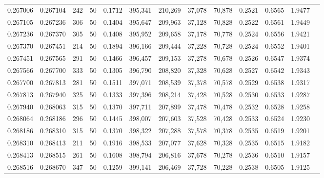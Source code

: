 \begin{tabular}{rrrrrrrrrrrrr}
0.267006 & 0.267104 &   242 &  50 &                                     0.1712 & 395,341 & 210,269 &  37,078 &  70,878 & 0.2521 & 0.6565 & 1.9477 \\
0.267105 & 0.267236 &   306 &  50 &                                     0.1404 & 395,647 & 209,963 &  37,128 &  70,828 & 0.2522 & 0.6561 & 1.9449 \\
0.267236 & 0.267370 &   305 &  50 &                                     0.1408 & 395,952 & 209,658 &  37,178 &  70,778 & 0.2524 & 0.6556 & 1.9421 \\
0.267370 & 0.267451 &   214 &  50 &                                     0.1894 & 396,166 & 209,444 &  37,228 &  70,728 & 0.2524 & 0.6552 & 1.9401 \\
0.267451 & 0.267565 &   291 &  50 &                                     0.1466 & 396,457 & 209,153 &  37,278 &  70,678 & 0.2526 & 0.6547 & 1.9374 \\
0.267566 & 0.267700 &   333 &  50 &                                     0.1305 & 396,790 & 208,820 &  37,328 &  70,628 & 0.2527 & 0.6542 & 1.9343 \\
0.267700 & 0.267813 &   281 &  50 &                                     0.1511 & 397,071 & 208,539 &  37,378 &  70,578 & 0.2529 & 0.6538 & 1.9317 \\
0.267813 & 0.267940 &   325 &  50 &                                     0.1333 & 397,396 & 208,214 &  37,428 &  70,528 & 0.2530 & 0.6533 & 1.9287 \\
0.267940 & 0.268063 &   315 &  50 &                                     0.1370 & 397,711 & 207,899 &  37,478 &  70,478 & 0.2532 & 0.6528 & 1.9258 \\
0.268064 & 0.268186 &   296 &  50 &                                     0.1445 & 398,007 & 207,603 &  37,528 &  70,428 & 0.2533 & 0.6524 & 1.9230 \\
0.268186 & 0.268310 &   315 &  50 &                                     0.1370 & 398,322 & 207,288 &  37,578 &  70,378 & 0.2535 & 0.6519 & 1.9201 \\
0.268310 & 0.268413 &   211 &  50 &                                     0.1916 & 398,533 & 207,077 &  37,628 &  70,328 & 0.2535 & 0.6515 & 1.9182 \\
0.268413 & 0.268515 &   261 &  50 &                                     0.1608 & 398,794 & 206,816 &  37,678 &  70,278 & 0.2536 & 0.6510 & 1.9157 \\
0.268516 & 0.268670 &   347 &  50 &                                     0.1259 & 399,141 & 206,469 &  37,728 &  70,228 & 0.2538 & 0.6505 & 1.9125 \\

\end{tabular}
